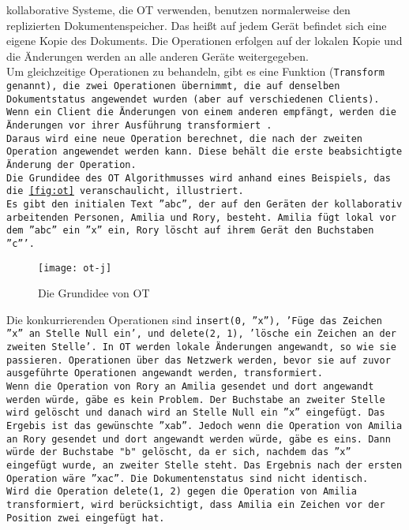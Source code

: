 %
\Gls{kollaborativ}e Systeme, die \gls{OT} verwenden, benutzen normalerweise den replizierten Dokumentenspeicher.
Das heißt auf jedem Gerät befindet sich eine eigene Kopie des Dokuments.
Die Operationen erfolgen auf der lokalen Kopie und die Änderungen werden an alle anderen Geräte weitergegeben.\\
Um gleichzeitige Operationen zu behandeln, gibt es eine Funktion (\tt{Transform} genannt), die zwei Operationen übernimmt, die auf denselben Dokumentstatus angewendet wurden (aber auf verschiedenen Clients).
Wenn ein Client die Änderungen von einem anderen empfängt, werden die Änderungen vor ihrer Ausführung transformiert~\cite{ot_paper}.\\
Daraus wird eine neue Operation berechnet, die nach der zweiten Operation angewendet werden kann.
Diese behält die erste beabsichtigte Änderung der Operation.\\
%
\clearpage
Die Grundidee des \gls{OT} Algorithmusses wird anhand eines Beispiels, das die \autoref{fig:ot} veranschaulicht, illustriert.\\
Es gibt den initialen Text ''abc'', der auf den Geräten der kollaborativ arbeitenden Personen, Amilia und Rory, besteht.
Amilia fügt lokal vor dem ''abc'' ein ''x'' ein, Rory löscht auf ihrem Gerät den Buchstaben ''c'''.
%
\begin{figure}[H]
  \centering
  \texttt{[image: ot-j]}
  \grayRule
  \caption{Die Grundidee von \gls{OT}}
  \label{fig:ot}
\end{figure}
%
Die konkurrierenden Operationen sind \tt{insert(0, ''x'')}, 'Füge das Zeichen ''x'' an Stelle Null ein', und \tt{delete(2, 1)}, 'lösche ein Zeichen an der zweiten Stelle'.
In \gls{OT} werden lokale Änderungen angewandt, so wie sie passieren. Operationen über das Netzwerk werden, bevor sie auf zuvor ausgeführte Operationen angewandt werden, transformiert.\\
%
Wenn die Operation von Rory an Amilia gesendet und dort angewandt werden würde, gäbe es kein Problem. Der Buchstabe an zweiter Stelle wird gelöscht und danach wird an Stelle Null ein ''x'' eingefügt. Das Ergebis ist das gewünschte ''xab''.
Jedoch wenn die Operation von Amilia an Rory gesendet und dort angewandt werden würde, gäbe es eins. Dann würde der Buchstabe "b" gelöscht, da er sich, nachdem das ''x'' eingefügt wurde, an zweiter Stelle steht. Das Ergebnis nach der ersten Operation wäre ''xac''. Die Dokumentenstatus sind nicht identisch.\\
%
Wird die Operation \tt{delete(1, 2)} gegen die Operation von Amilia transformiert, wird berücksichtigt, dass Amilia ein Zeichen vor der Position zwei eingefügt hat.\\\\

